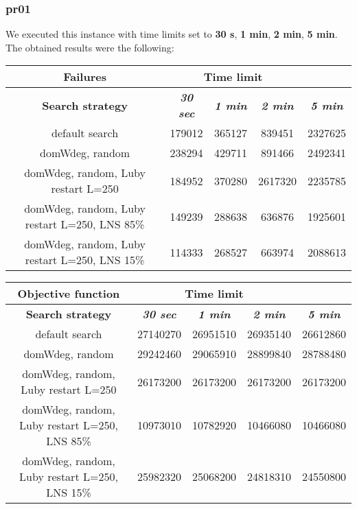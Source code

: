 \subsubsection{pr01}
We executed this instance with time limits set to \textbf{30 s}, \textbf{1 min}, \textbf{2 min}, \textbf{5 min}.\\
The obtained results were the following:
{
\renewcommand{\arraystretch}{2}
\begin{longtable}[h]{| c | c | c | c | c |}
    \hline
    \textbf{Failures} & \multicolumn{3}{c}{Time limit} & \\
    \hline
    \textbf{Search strategy} & \textbf{\textit{30 sec}} & \textbf{\textit{1 min}} & \textbf{\textit{2 min}} & \textbf{\textit{5 min}} \\
    \hline
    \endhead
    default search                                & 179012 & 365127 &  839451 & 2327625 \\
    \hline
    domWdeg, random                               & 238294 & 429711 &  891466 & 2492341 \\
    \hline
    domWdeg, random, Luby restart L=250           & 184952 & 370280 & 2617320 & 2235785 \\
    \hline
    domWdeg, random, Luby restart L=250, LNS 85\% & 149239 & 288638 &  636876 & 1925601 \\
    \hline
    domWdeg, random, Luby restart L=250, LNS 15\% & 114333 & 268527 &  663974 & 2088613 \\
    \hline
\end{longtable}
}

{
\renewcommand{\arraystretch}{2}
\begin{longtable}[h]{| c | c | c | c | c |}
    \hline
    \textbf{Objective function} & \multicolumn{3}{c}{Time limit} & \\
    \hline
    \textbf{Search strategy} & \textbf{\textit{30 sec}} & \textbf{\textit{1 min}} & \textbf{\textit{2 min}} & \textbf{\textit{5 min}} \\
    \hline
    \endhead
    default search                                & 27140270 & 26951510 & 26935140 & 26612860 \\
    \hline
    domWdeg, random                               & 29242460 & 29065910 & 28899840 & 28788480 \\
    \hline
    domWdeg, random, Luby restart L=250           & 26173200 & 26173200 & 26173200 & 26173200 \\
    \hline
    domWdeg, random, Luby restart L=250, LNS 85\% & 10973010 & 10782920 & 10466080 & 10466080 \\
    \hline
    domWdeg, random, Luby restart L=250, LNS 15\% & 25982320 & 25068200 & 24818310 & 24550800 \\
    \hline
\end{longtable}
}